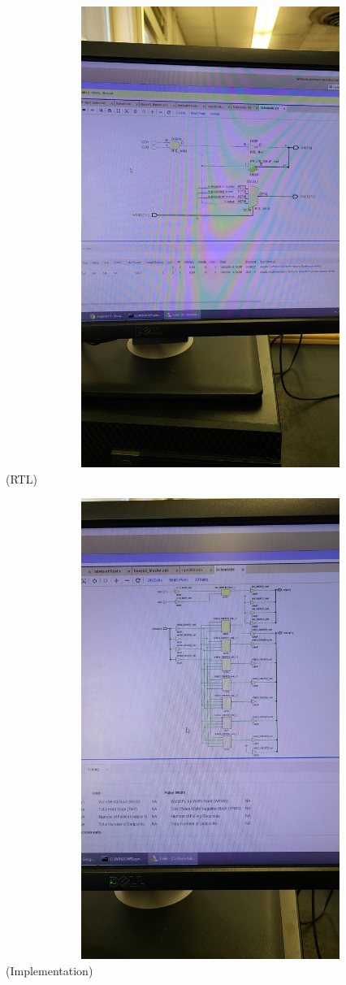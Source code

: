 \documentclass[11pt]{article}
\begin{document}
\begin{center}
    \includegraphics[width=15cm,height=15cm]{rtl}\newline
    (RTL)\end{center}
    \includegraphics[width=15cm,height=15cm]{imp}\newline
(Implementation)
\end{document}
